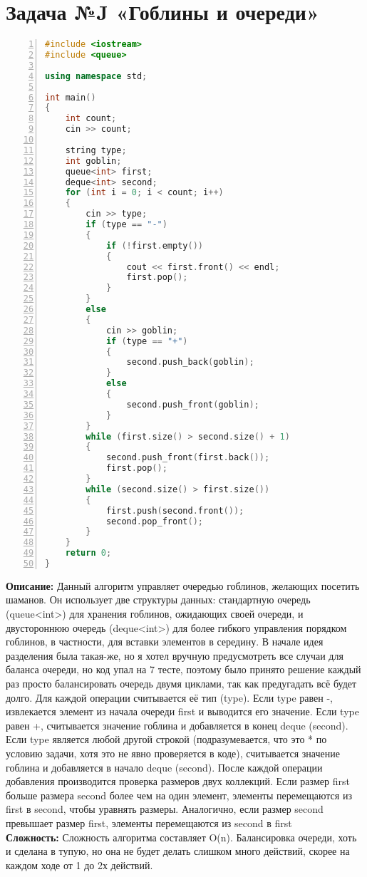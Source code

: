 \documentclass{article}
\newcommand{\descr}[2]{%
    \textbf{Описание: } #1\\
    \textbf{Сложность: } #2
}
\begin{document}
\section{Задача №J «Гоблины и очереди»}
\begin{lstlisting}[language=C++, frame=single, basicstyle=\ttfamily, numbers=left, numberstyle=\tiny]
#include <iostream>
#include <queue>

using namespace std;

int main()
{
    int count;
    cin >> count;

    string type;
    int goblin;
    queue<int> first;
    deque<int> second;
    for (int i = 0; i < count; i++)
    {
        cin >> type;
        if (type == "-")
        {
            if (!first.empty())
            {
                cout << first.front() << endl;
                first.pop();
            }
        }
        else
        {
            cin >> goblin;
            if (type == "+")
            {
                second.push_back(goblin);
            }
            else
            {
                second.push_front(goblin);
            }
        }
        while (first.size() > second.size() + 1)
        {
            second.push_front(first.back());
            first.pop();
        }
        while (second.size() > first.size())
        {
            first.push(second.front());
            second.pop_front();
        }
    }
    return 0;
}
\end{lstlisting}
\descr{
    Данный алгоритм управляет очередью гоблинов, желающих посетить шаманов. Он использует две структуры данных: стандартную очередь (queue<int>) для хранения гоблинов, ожидающих своей очереди, и двустороннюю очередь (deque<int>) для более гибкого управления порядком гоблинов, в частности, для вставки элементов в середину. 
    В начале идея разделения была такая-же, но я хотел вручную предусмотреть все случаи для баланса очереди, но код упал на 7 тесте, поэтому было принято решение каждый раз просто балансировать очередь двумя циклами, так как предугадать всё будет долго.
    Для каждой операции считывается её тип (type). Если type равен -, извлекается элемент из начала очереди first и выводится его значение.
Если type равен +, считывается значение гоблина и добавляется в конец deque (second).
Если type является любой другой строкой (подразумевается, что это * по условию задачи, хотя это не явно проверяется в коде), считывается значение гоблина и добавляется в начало deque (second).
После каждой операции добавления производится проверка размеров двух коллекций. Если размер first больше размера second более чем на один элемент, элементы перемещаются из first в second, чтобы уравнять размеры. Аналогично, если размер second превышает размер first, элементы перемещаются из second в first
}{Сложность алгоритма составляет O(n). Балансировка очереди, хоть и сделана в тупую, но она не будет делать слишком много действий, скорее на каждом ходе от 1 до 2х действий.}
\end{document}
